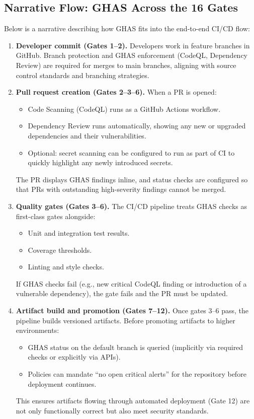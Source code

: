 \documentclass[11pt]{article}
\begin{document}
\subsection{Narrative Flow: GHAS Across the 16 Gates}

Below is a narrative describing how GHAS fits into the end-to-end CI/CD flow:

\begin{enumerate}[leftmargin=*]
  \item \textbf{Developer commit (Gates 1--2).}
  Developers work in feature branches in GitHub. Branch protection and GHAS enforcement (CodeQL, Dependency Review) are required for merges to main branches, aligning with source control standards and branching strategies.

  \item \textbf{Pull request creation (Gates 2--3--6).}
  When a PR is opened:
  \begin{itemize}
    \item Code Scanning (CodeQL) runs as a GitHub Actions workflow.
    \item Dependency Review runs automatically, showing any new or upgraded dependencies and their vulnerabilities.
    \item Optional: secret scanning can be configured to run as part of CI to quickly highlight any newly introduced secrets.
  \end{itemize}
  The PR displays GHAS findings inline, and status checks are configured so that PRs with outstanding high-severity findings cannot be merged.

  \item \textbf{Quality gates (Gates 3--6).}
  The CI/CD pipeline treats GHAS checks as first-class gates alongside:
  \begin{itemize}
    \item Unit and integration test results.
    \item Coverage thresholds.
    \item Linting and style checks.
  \end{itemize}
  If GHAS checks fail (e.g., new critical CodeQL finding or introduction of a vulnerable dependency), the gate fails and the PR must be updated.

  \item \textbf{Artifact build and promotion (Gates 7--12).}
  Once gates 3--6 pass, the pipeline builds versioned artifacts. Before promoting artifacts to higher environments:
  \begin{itemize}
    \item GHAS status on the default branch is queried (implicitly via required checks or explicitly via APIs).
    \item Policies can mandate ``no open critical alerts'' for the repository before deployment continues.
  \end{itemize}
  This ensures artifacts flowing through automated deployment (Gate 12) are not only functionally correct but also meet security standards.


\end{enumerate}
\end{document}
